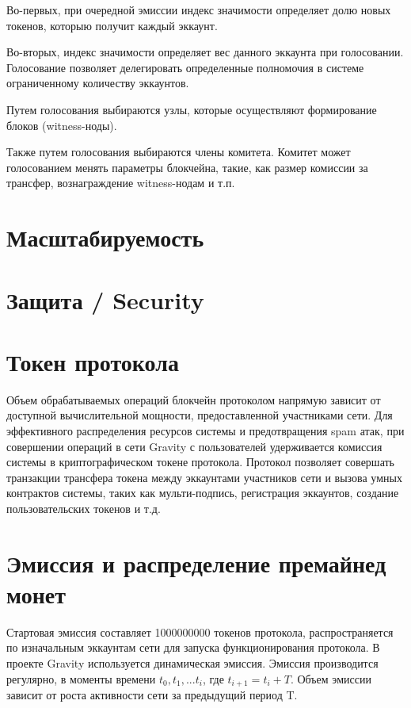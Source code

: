 \documentclass[a4paper,12pt]{article}
\begin{document}
Во-первых, при очередной эмиссии индекс значимости определяет долю новых токенов, которыю получит каждый эккаунт.

Во-вторых, индекс значимости определяет вес данного эккаунта при голосовании. Голосование позволяет делегировать определенные полномочия в системе ограниченному количеству эккаунтов.

Путем голосования выбираются узлы, которые осуществляют формирование блоков (witness-ноды). 

Также путем голосования выбираются члены комитета. Комитет может голосованием менять параметры блокчейна, такие, как размер комиссии за трансфер, вознаграждение witness-нодам и т.п.


\section{Масштабируемость}

\section{Защита / Security}

\section{Токен протокола}
Объем обрабатываемых операций блокчейн протоколом напрямую зависит от доступной вычислительной мощности, предоставленной участниками сети. Для эффективного распределения ресурсов системы и предотвращения spam атак, при совершении операций в сети Gravity с пользователей удерживается комиссия системы в криптографическом токене протокола.
Протокол позволяет совершать транзакции трансфера токена между эккаунтами участников сети и вызова умных контрактов системы, таких как мульти-подпись, регистрация эккаунтов, создание пользовательских токенов и т.д. 

\section{Эмиссия и распределение премайнед монет}

Стартовая эмиссия составляет 1000000000 токенов протокола, распространяется по изначальным эккаунтам сети для запуска функционирования протокола.   
В проекте Gravity используется динамическая эмиссия. Эмиссия производится регулярно, в моменты времени $t_0, t_1, ... t_i$, где $t_{i+1} = t_i + T$. Объем эмиссии зависит от роста активности сети за предыдущий период T.
\end{document}
